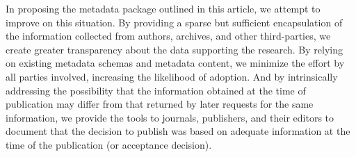 In proposing the
metadata package outlined in this article, we attempt to improve on this
situation. By providing a sparse but sufficient encapsulation of the
information collected from authors, archives, and other third-parties,
we create greater transparency about the data supporting the research.
By relying on existing metadata schemas and metadata content, we
minimize the effort by all parties involved, increasing the likelihood
of adoption. And by intrinsically addressing the possibility that the
information obtained at the time of publication may differ from that returned by later
requests for the same information, we provide the tools to journals,
publishers, and their editors to document that the decision to publish
was based on adequate information at the time of the publication (or
acceptance decision).

